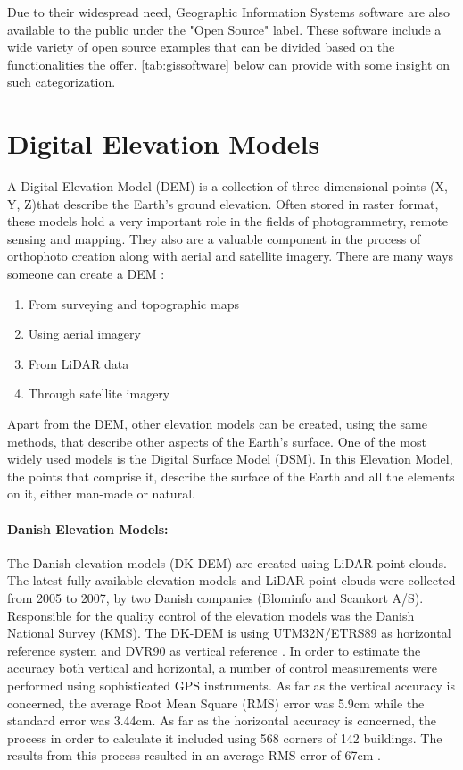Due to their widespread need, Geographic Information Systems software are also available to the public under the "Open Source" label. These software include a wide variety of open source examples that can be divided based on the functionalities the offer. \autoref{tab:gissoftware} below can provide with some insight on such categorization. 

\section{Digital Elevation Models}
A Digital Elevation Model (DEM) is a collection of three-dimensional points (X, Y, Z)that describe the Earth's ground elevation. Often stored in raster format, these models hold a very important role in the fields of photogrammetry, remote sensing and mapping. They also are a valuable component in the process of orthophoto creation along with aerial and satellite imagery. There are many ways someone can create a DEM \citep{dem}:

\begin{enumerate}
\item From surveying and topographic maps
\item Using aerial imagery
\item From LiDAR data
\item Through satellite imagery
\end{enumerate}

Apart from the DEM, other elevation models can be created, using the same methods, that describe other aspects of the Earth's surface. One of the most widely used models is the Digital Surface Model (DSM). In this Elevation Model, the points that comprise it, describe the surface of the Earth and all the elements on it, either man-made or natural.

\paragraph{Danish Elevation Models:} The Danish elevation models (DK-DEM) are created using LiDAR point clouds. The latest fully available elevation models and LiDAR point clouds were collected from 2005 to 2007, by two Danish companies (Blominfo and Scankort A/S). Responsible for the quality control of the elevation models was the Danish National Survey (KMS). The DK-DEM is using UTM32N/ETRS89 as horizontal reference system and DVR90 as vertical reference \citep{demdk}.
In order to estimate the accuracy both vertical and horizontal, a number of control measurements were performed using sophisticated GPS instruments. As far as the vertical accuracy is concerned, the average Root Mean Square (RMS) error was 5.9cm while the standard error was 3.44cm. As far as the horizontal accuracy is concerned, the process in order to calculate it included using 568 corners of 142 buildings. The results from this process resulted in an average RMS error of 67cm \citep{demdk}.

